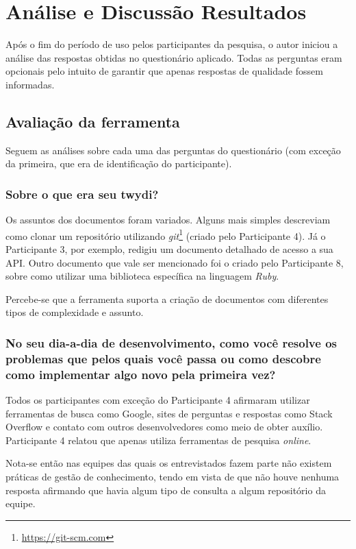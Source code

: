 \chapter{Análise e Discussão Resultados}

Após o fim do período de uso pelos participantes da pesquisa, o autor iniciou a análise das respostas obtidas no questionário aplicado. Todas as perguntas eram opcionais pelo intuito de garantir que apenas respostas de qualidade fossem informadas.

\section{Avaliação da ferramenta}

Seguem as análises sobre cada uma das perguntas do questionário (com exceção da primeira, que era de identificação do participante).

\subsection{Sobre o que era seu twydi?}

Os assuntos dos documentos foram variados. Alguns mais simples descreviam como clonar um repositório utilizando \textit{git}\footnote{\url{https://git-scm.com}} (criado pelo Participante 4). Já o Participante 3, por exemplo, redigiu um documento detalhado de acesso a sua API. Outro documento que vale ser mencionado foi o criado pelo Participante 8, sobre como utilizar uma biblioteca específica na linguagem \textit{Ruby}.

Percebe-se que a ferramenta suporta a criação de documentos com diferentes tipos de complexidade e assunto.

\subsection{No seu dia-a-dia de desenvolvimento, como você resolve os problemas que pelos quais você passa ou como descobre como implementar algo novo pela primeira vez?}

Todos os participantes com exceção do Participante 4 afirmaram utilizar ferramentas de busca como Google, sites de perguntas e respostas como Stack Overflow e contato com outros desenvolvedores como meio de obter auxílio. Participante 4 relatou que apenas utiliza ferramentas de pesquisa \textit{online}.

Nota-se então nas equipes das quais os entrevistados fazem parte não existem práticas de gestão de conhecimento, tendo em vista de que não houve nenhuma resposta afirmando que havia algum tipo de consulta a algum repositório da equipe.

